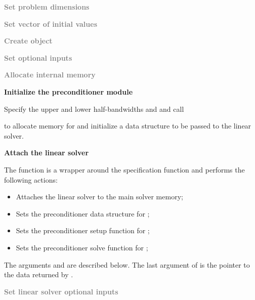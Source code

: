 \begin{Steps}
  
\item
  \textcolor{gray}{\bf Set problem dimensions}

\item
  \textcolor{gray}{\bf Set vector of initial values}
 
\item
  \textcolor{gray}{\bf Create {\cvode} object}

\item
  \textcolor{gray}{\bf Set optional inputs}

\item
  \textcolor{gray}{\bf Allocate internal memory}

\item \label{i:bandpre_init}
  {\bf Initialize the {\cvbandpre} preconditioner module}

  Specify the upper and lower half-bandwidths  and  and call 


  to allocate memory for and initialize a data structure  to be 
  passed to the {\cvspgmr} linear solver.

\item \label{i:bandpre_attach}
  {\bf Attach the {\cvspgmr} linear solver}


  The function  is a wrapper around the {\cvspgmr} specification
  function  and performs the following actions:
  \begin{itemize}
    \item Attaches the {\cvspgmr} linear solver to the main {\cvode} solver memory;
    \item Sets the preconditioner data structure for {\cvbandpre};
    \item Sets the preconditioner setup function for {\cvbandpre};
    \item Sets the preconditioner solve function for {\cvbandpre};
  \end{itemize}
  The arguments  and  are described below.
  The last argument of  is the pointer to the {\cvbandpre} data
  returned by .

\item
  \textcolor{gray}{\bf Set linear solver optional inputs}


\end{Steps}
